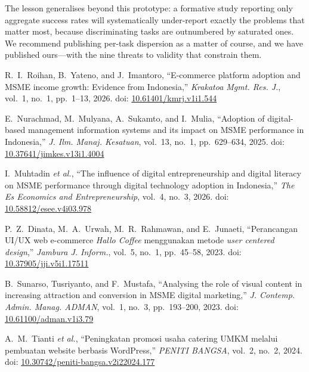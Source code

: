 \documentclass[conference]{IEEEtran}
\begin{document}
The lesson generalises beyond this prototype: a formative study reporting
only aggregate success rates will systematically under-report exactly the
problems that matter most, because discriminating tasks are outnumbered by
saturated ones. We recommend publishing per-task dispersion as a matter of
course, and we have published ours---with the nine threats to validity that
constrain them.

\begin{thebibliography}{}
\scriptsize

R.~I.~Roihan, B.~Yateno, and J.~Imantoro, ``E-commerce platform adoption
and MSME income growth: Evidence from Indonesia,'' \emph{Krakatoa Mgmt.
Res. J.}, vol.~1, no.~1, pp.~1--13, 2026. doi:
\href{https://doi.org/10.61401/kmrj.v1i1.544}{10.61401/kmrj.v1i1.544}

E.~Nurachmad, M.~Mulyana, A.~Sukamto, and I.~Mulia, ``Adoption of
digital-based management information systems and its impact on MSME
performance in Indonesia,'' \emph{J. Ilm. Manaj. Kesatuan}, vol.~13, no.~1,
pp.~629--634, 2025. doi:
\href{https://doi.org/10.37641/jimkes.v13i1.4004}{10.37641/jimkes.v13i1.4004}

I.~Muhtadin \emph{et al.}, ``The influence of digital entrepreneurship
and digital literacy on MSME performance through digital technology
adoption in Indonesia,'' \emph{The Es Economics and Entrepreneurship},
vol.~4, no.~3, 2026. doi:
\href{https://doi.org/10.58812/esee.v4i03.978}{10.58812/esee.v4i03.978}

P.~Z.~Dinata, M.~A.~Urwah, M.~R.~Rahmawan, and E.~Junaeti,
``Perancangan UI/UX web e-commerce \emph{Hallo Coffee} menggunakan metode
\emph{user centered design},'' \emph{Jambura J. Inform.}, vol.~5, no.~1,
pp.~45--58, 2023. doi: \href{https://doi.org/10.37905/jji.v5i1.17511}{10.37905/jji.v5i1.17511}

B.~Sunarso, Tusriyanto, and F.~Mustafa, ``Analysing the role of visual
content in increasing attraction and conversion in MSME digital
marketing,'' \emph{J. Contemp. Admin. Manag. ADMAN}, vol.~1, no.~3,
pp.~193--200, 2023. doi: \href{https://doi.org/10.61100/adman.v1i3.79}{10.61100/adman.v1i3.79}

A.~M.~Tianti \emph{et al.}, ``Peningkatan promosi usaha catering UMKM melalui
pembuatan website berbasis WordPress,'' \emph{PENITI BANGSA}, vol.~2,
no.~2, 2024. doi: \href{https://doi.org/10.30742/peniti-bangsa.v2i22024.177}{10.30742/peniti-bangsa.v2i22024.177}


\end{thebibliography}
\end{document}
